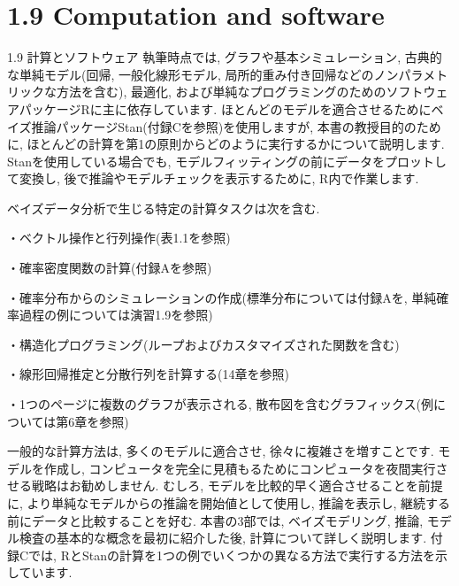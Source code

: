 \documentclass[10pt,dvipdfmx,a4]{beamer}
\begin{document}
\section{1.9 Computation and software}
\begin{frame}{1.9 計算とソフトウェア}
執筆時点では, グラフや基本シミュレーション, 古典的な単純モデル(回帰, 一般化線形モデル, 局所的重み付き回帰などのノンパラメトリックな方法を含む), 最適化, および単純なプログラミングのためのソフトウェアパッケージRに主に依存しています.
ほとんどのモデルを適合させるためにベイズ推論パッケージStan(付録Cを参照)を使用しますが, 本書の教授目的のために, ほとんどの計算を第1の原則からどのように実行するかについて説明します.
Stanを使用している場合でも, モデルフィッティングの前にデータをプロットして変換し, 後で推論やモデルチェックを表示するために, R内で作業します.
\end{frame}


\begin{frame}
ベイズデータ分析で生じる特定の計算タスクは次を含む.

・ベクトル操作と行列操作(表1.1を参照)

・確率密度関数の計算(付録Aを参照)

・確率分布からのシミュレーションの作成(標準分布については付録Aを, 単純確率過程の例については演習1.9を参照)

・構造化プログラミング(ループおよびカスタマイズされた関数を含む)

・線形回帰推定と分散行列を計算する(14章を参照)

・1つのページに複数のグラフが表示される, 散布図を含むグラフィックス(例については第6章を参照)

一般的な計算方法は, 多くのモデルに適合させ, 徐々に複雑さを増すことです.
モデルを作成し, コンピュータを完全に見積もるためにコンピュータを夜間実行させる戦略はお勧めしません.
むしろ, モデルを比較的早く適合させることを前提に, より単純なモデルからの推論を開始値として使用し, 推論を表示し, 継続する前にデータと比較することを好む.
本書の3部では, ベイズモデリング, 推論, モデル検査の基本的な概念を最初に紹介した後, 計算について詳しく説明します.
付録Cでは, RとStanの計算を1つの例でいくつかの異なる方法で実行する方法を示しています.
\end{frame}

\end{document}
